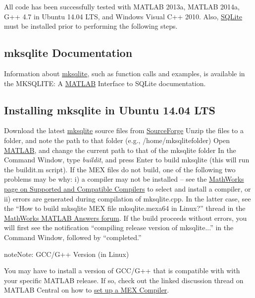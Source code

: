 \documentclass[letterpaper,10pt,english]{sphinxmanual}
\begin{document}
All code has been successfully tested with MATLAB 2013a, MATLAB 2014a, G++ 4.7 in Ubuntu 14.04 LTS, and Windows Visual C++ 2010.  Also, \href{http://www.sqlite.org/}{SQLite} must be installed prior to performing the following steps.


\subsection{mksqlite Documentation}
\label{doc/Addons:mksqlite-documentation}
Information about \href{http://sourceforge.net/projects/mksqlite/}{mksqlite}, such as function calls and examples, is available in the MKSQLITE: A \href{http://www.mathworks.com/products/matlab/}{MATLAB} Interface to SQLite documentation.


\subsection{Installing mksqlite in Ubuntu 14.04 LTS}
\label{doc/Addons:installing-mksqlite-in-ubuntu-14-04-lts}
Download the latest \href{http://sourceforge.net/projects/mksqlite/}{mksqlite} source files from \href{http://sourceforge.net/projects/mksqlite/files/}{SourceForge}
Unzip the files to a folder, and note the path to that folder (e.g., /home/mksqlitefolder)
Open \href{http://www.mathworks.com/products/matlab/}{MATLAB}, and change the current path to that of the mksqlite folder
In the Command Window, type \emph{buildit}, and press Enter to build mksqlite (this will run the buildit.m script).  If the MEX files do not build, one of the following two problems may be why:
i) a compiler may not be installed -- see the \href{http://www.mathworks.com/support/compilers/R2014b/index.html}{MathWorks page on Supported and Compatible Compilers} to select and install a compiler, or ii) errors are generated during compilation of mksqlite.cpp.  In the latter case, see the “How to build mksqlite MEX file mksqlite.mexa64 in Linux?” thread in the \href{http://www.mathworks.com/matlabcentral/answers/86590-how-to-build-mksqlite-mex-file-mksqlite-mexa64-in-linux}{MathWorks MATLAB Answers forum}.
If the build proceeds without errors, you will first see the notification “compiling release version of mksqlite...” in the Command Window, followed by “completed.”

\begin{notice}{note}{Note:}
GCC/G++ Version (in Linux)

You may have to install a version of GCC/G++ that is compatible with with your specific MATLAB release.  If so, check out the linked discussion thread on MATLAB Central on how to \href{http://www.mathworks.com/matlabcentral/answers/137228-setup-mex-compiler-for-r2014a-for-linux}{set up a MEX Compiler}.
\end{notice}
\end{document}
